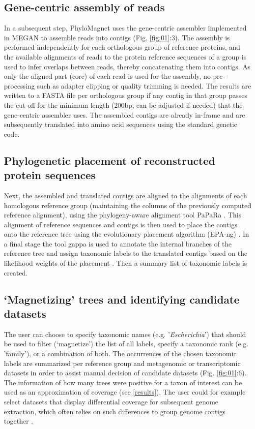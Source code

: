 \documentclass{bioinfo}
\begin{document}
\begin{methods}
\subsection{Gene-centric assembly of reads}\label{gc-assembly}
In a subsequent step, PhyloMagnet uses the gene-centric assembler implemented in MEGAN \citep{Huson2016,Huson2017} to assemble reads into contigs (Fig. \ref{fig:01}:3). The assembly is performed independently for each orthologous group of reference proteins, and the available alignments of reads to the protein reference sequences of a group is used to infer overlaps between reads, thereby concatenating them into contigs. As only the aligned part (core) of each read is used for the assembly, no pre-processing such as adapter clipping or quality trimming is needed. The results are written to a FASTA file per orthologous group if any contig in that group passes the cut-off for the minimum length (200bp, can be adjusted if needed) that the gene-centric assembler uses. The assembled contigs are already in-frame and are subsequently translated into amino acid sequences using the standard genetic code.

\subsection{Phylogenetic placement of reconstructed protein sequences}
Next, the assembled and translated contigs are aligned to the alignments of each homologous reference group (maintaining the columns of the previously computed reference alignment), using the phylogeny-aware alignment tool PaPaRa \citep[Fig. \ref{fig:01}:4;][]{Berger2011a}. This alignment of reference sequences and contigs is then used to place the contigs onto the reference tree using the evolutionary placement algorithm (EPA-ng) \citep[Fig. \ref{fig:01}:5;][]{Berger2011b,Barbera2019}. In a final stage the tool gappa is used to annotate the internal branches of the reference tree and assign taxonomic labels to the translated contigs based on the likelihood weights of the placement \citep{Czech2019}. Then a summary list of taxonomic labels is created.

\subsection{‘Magnetizing’ trees and identifying candidate datasets}
The user can choose to specify taxonomic names (e.g. '\textit{Escherichia}') that should be used to filter (‘magnetize’) the list of all labels, specify a taxonomic rank (e.g. 'family'), or a combination of both. The occurrences of the chosen taxonomic labels are summarized per reference group and metagenomic or transcriptomic datasets  in order to assist manual decision of candidate datasets (Fig. \ref{fig:01}:6). The information of how many trees were positive for a taxon of interest can be used as an approximation of coverage (see \ref{results}). The user could for example select datasets that display differential coverage for subsequent genome extraction, which often relies on such differences to group genome contigs together \citep{Albertsen2013,Alneberg2014}. 


\end{methods}
\end{document}
